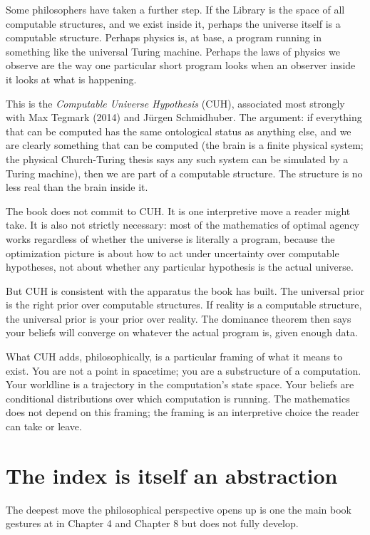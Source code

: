 Some philosophers have taken a further step. If the Library is the space of all computable structures, and we exist inside it, perhaps the universe itself is a computable structure. Perhaps physics is, at base, a program running in something like the universal Turing machine. Perhaps the laws of physics we observe are the way one particular short program looks when an observer inside it looks at what is happening.

This is the \emph{Computable Universe Hypothesis} (CUH), associated most strongly with Max Tegmark (2014) and J\"urgen Schmidhuber. The argument: if everything that can be computed has the same ontological status as anything else, and we are clearly something that can be computed (the brain is a finite physical system; the physical Church-Turing thesis says any such system can be simulated by a Turing machine), then we are part of a computable structure. The structure is no less real than the brain inside it.

The book does not commit to CUH. It is one interpretive move a reader might take. It is also not strictly necessary: most of the mathematics of optimal agency works regardless of whether the universe is literally a program, because the optimization picture is about how to act under uncertainty over computable hypotheses, not about whether any particular hypothesis is the actual universe.

But CUH is consistent with the apparatus the book has built. The universal prior is the right prior over computable structures. If reality is a computable structure, the universal prior is your prior over reality. The dominance theorem then says your beliefs will converge on whatever the actual program is, given enough data.

What CUH adds, philosophically, is a particular framing of what it means to exist. You are not a point in spacetime; you are a substructure of a computation. Your worldline is a trajectory in the computation's state space. Your beliefs are conditional distributions over which computation is running. The mathematics does not depend on this framing; the framing is an interpretive choice the reader can take or leave.

\section*{The index is itself an abstraction}

The deepest move the philosophical perspective opens up is one the main book gestures at in Chapter 4 and Chapter 8 but does not fully develop.

